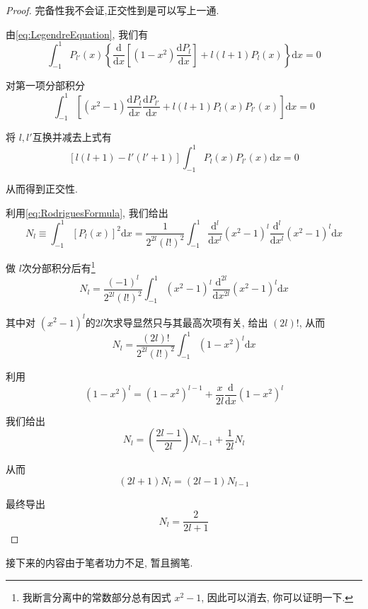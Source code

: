 \begin{proof}
    完备性我不会证,正交性到是可以写上一通.

    由\cref{eq:LegendreEquation}, 我们有
    \begin{equation}
        \int_{-1}^1 P_{l'}(x)\left\{ \frac{\mathrm{d}}{\mathrm{d}x}\left[ (1-x^2)\frac{\mathrm{d}P_l}{\mathrm{d}x}\right] +l(l+1)P_l(x) \right\}  \mathrm{d}x = 0
    \end{equation}

    对第一项分部积分
    \begin{equation}
        \int_{-1}^1 \left[(x^2-1)\frac{\mathrm{d}P_l}{\mathrm{d}x}\frac{\mathrm{d}P_{l'}}{\mathrm{d}x} +l(l+1)P_l(x)P_{l'}(x) \right] \mathrm{d}x = 0
    \end{equation}

    将 $l,l'$互换并减去上式有
    \begin{equation}
        \left[ l(l+1) - l'(l'+1) \right] \int_{-1}^1 P_l(x)P_{l'}(x) \mathrm{d}x = 0
    \end{equation}

    从而得到正交性.

    利用\cref{eq:RodriguesFormula}, 我们给出
    \begin{equation}
        N_l\equiv \int_{-1}^1 [P_l(x)]^2 \mathrm{d}x =\frac{1}{2^{2l}(l!)^2}\int_{-1}^1 \frac{\mathrm{d}^l}{\mathrm{d}x^l}(x^2-1)^l\frac{\mathrm{d}^l}{\mathrm{d}x^l}(x^2-1)^l\mathrm{d}x
    \end{equation}

    做 $l$次分部积分后有\footnote{我断言分离中的常数部分总有因式 $x^2-1$, 因此可以消去, 你可以证明一下.}
    \begin{equation}
        N_l =\frac{(-1)^l}{2^{2l}(l!)^2}\int_{-1}^1 (x^2-1)^l\frac{\mathrm{d}^{2l}}{\mathrm{d}x^{2l}}(x^2-1)^l\mathrm{d}x
    \end{equation}

    其中对 $(x^2-1)^l$的$2l$次求导显然只与其最高次项有关, 给出 $(2l)!$, 从而
    \begin{equation}
        N_l =\frac{(2l)!}{2^{2l}(l!)^2}\int_{-1}^1 (1-x^2)^l\mathrm{d}x
    \end{equation}

    利用
    $$
    (1-x^2)^l = (1-x^2)^{l-1}+\frac{x}{2l}\frac{\mathrm{d}}{\mathrm{d}x}(1-x^2)^l
    $$

    我们给出
    \begin{equation}
        N_l = \left( \frac{2l-1}{2l} \right)N_{l-1} + \frac{1}{2l}N_l 
    \end{equation}

    从而 
    \begin{equation}
        (2l+1)N_l = (2l-1)N_{l-1}
    \end{equation}

    最终导出
    \begin{equation}
        N_l = \frac{2}{2l+1}
    \end{equation}
\end{proof}

接下来的内容由于笔者功力不足, 暂且搁笔. 



